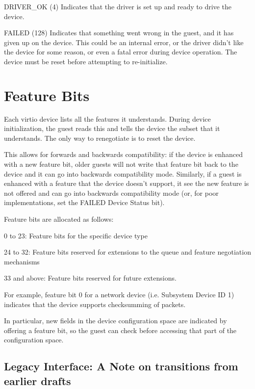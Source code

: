   DRIVER_OK (4) Indicates that the driver is set up and ready to
  drive the device.

  FAILED (128) Indicates that something went wrong in the guest,
  and it has given up on the device. This could be an internal
  error, or the driver didn't like the device for some reason, or
  even a fatal error during device operation. The device must be
  reset before attempting to re-initialize.

\section{Feature Bits}\label{sec:Basic Facilities of a Virtio Device / Feature Bits}

Each virtio device lists all the features it understands.  During
device initialization, the guest reads this and tells the device the
subset that it understands.  The only way to renegotiate is to reset
the device.

This allows for forwards and backwards compatibility: if the device is
enhanced with a new feature bit, older guests will not write that
feature bit back to the device and it can go into backwards
compatibility mode. Similarly, if a guest is enhanced with a feature
that the device doesn't support, it see the new feature is not offered
and can go into backwards compatibility mode (or, for poor
implementations, set the FAILED Device Status bit).

Feature bits are allocated as follows:

  0 to 23: Feature bits for the specific device type

  24 to 32: Feature bits reserved for extensions to the queue and
  feature negotiation mechanisms

  33 and above: Feature bits reserved for future extensions.

For example, feature bit 0 for a network device (i.e. Subsystem
Device ID 1) indicates that the device supports checksumming of
packets.

In particular, new fields in the device configuration space are
indicated by offering a feature bit, so the guest can check
before accessing that part of the configuration space.

\subsection{Legacy Interface: A Note on transitions from earlier drafts}\label{sec:Basic Facilities of a Virtio Device / Feature Bits / Legacy Interface: A Note on transitions from earlier drafts}

